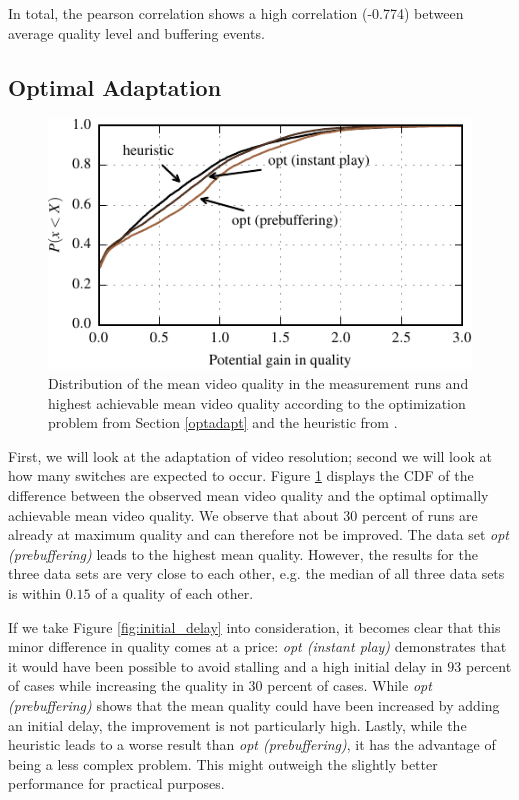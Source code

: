 In total, the pearson correlation shows a high correlation (-0.774) between average quality level and buffering events.

\subsection{Optimal Adaptation}

\begin{figure}[t]
\centering
\includegraphics[width=\columnwidth]{figs/qualitygain_py}%
\caption{Distribution of the mean video quality in the measurement runs and highest achievable mean video quality according to the optimization problem from Section \ref{optadapt} and the heuristic from \cite{sieber16sacrificing}.}
\label{fig:opt}%
\end{figure}

First, we will look at the adaptation of video resolution; second we will look at how many switches are expected to occur. Figure \ref{fig:opt} displays the CDF of the difference between the observed mean video quality and the optimal optimally achievable mean video quality. We observe that about $30$ percent of runs are already at maximum quality and can therefore not be improved. The data set \textit{opt (prebuffering)} leads to the highest mean quality. However, the results for the three data sets are very close to each other, e.g. the median of all three data sets is within $0.15$ of a quality of each other.

If we take Figure \ref{fig:initial_delay} into consideration, it becomes clear that this minor difference in quality comes at a price: \textit{opt (instant play)} demonstrates that it would have been possible to avoid stalling and a high initial delay in $93$ percent of cases while increasing the quality in $30$ percent of cases. While \textit{opt (prebuffering)} shows that the mean quality could have been increased by adding an initial delay, the improvement is not particularly high. Lastly, while the heuristic leads to a worse result than \textit{opt (prebuffering)}, it has the advantage of being a less complex problem. This might outweigh the slightly better performance for practical purposes.

